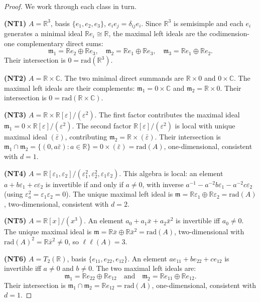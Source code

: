 \documentclass{amsart}
\theoremstyle{plain}
\theoremstyle{definition}
\theoremstyle{remark}
\newcommand{\RR}{\mathbb{R}}
\newcommand{\CC}{\mathbb{C}}
\newcommand{\Jac}{\mathrm{rad}}
\newcommand{\LL}{\ell\ell}
\begin{document}
\begin{proof}
We work through each class in turn.

\smallskip\noindent
\textbf{(NT1)} $A = \RR^3$, basis $\{e_1, e_2, e_3\}$, $e_ie_j = \delta_{ij}e_i$.
Since $\RR^3$ is semisimple and each $e_i$ generates a minimal ideal
$\RR e_i \cong \RR$, the maximal left ideals are the codimension-one
complementary direct sums:
\[
  \mathfrak{m}_1 = \RR e_2 \oplus \RR e_3,\quad
  \mathfrak{m}_2 = \RR e_1 \oplus \RR e_3,\quad
  \mathfrak{m}_3 = \RR e_1 \oplus \RR e_2.
\]
Their intersection is $0 = \Jac(\RR^3)$.

\smallskip\noindent
\textbf{(NT2)} $A = \RR \times \CC$.
The two minimal direct summands are $\RR \times 0$ and $0 \times \CC$.
The maximal left ideals are their complements:
$\mathfrak{m}_1 = 0 \times \CC$ and $\mathfrak{m}_2 = \RR \times 0$.
Their intersection is $0 = \Jac(\RR \times \CC)$.

\smallskip\noindent
\textbf{(NT3)} $A = \RR \times \RR[\varepsilon]/(\varepsilon^2)$.
The first factor contributes the maximal ideal
$\mathfrak{m}_1 = 0 \times \RR[\varepsilon]/(\varepsilon^2)$.
The second factor $\RR[\varepsilon]/(\varepsilon^2)$ is local with
unique maximal ideal $(\bar\varepsilon)$, contributing
$\mathfrak{m}_2 = \RR \times (\bar\varepsilon)$.
Their intersection is
$\mathfrak{m}_1 \cap \mathfrak{m}_2
 = \{(0, a\bar\varepsilon) : a \in \RR\}
 = 0 \times (\bar\varepsilon) = \Jac(A)$,
one-dimensional, consistent with $d = 1$.

\smallskip\noindent
\textbf{(NT4)} $A = \RR[\varepsilon_1, \varepsilon_2]/(\varepsilon_1^2, \varepsilon_2^2, \varepsilon_1 \varepsilon_2)$.
This algebra is local: an element $a + b\varepsilon_1 + c\varepsilon_2$ is invertible
if and only if $a \neq 0$, with inverse
$a^{-1} - a^{-2}b\varepsilon_1 - a^{-2}c\varepsilon_2$ (using $\varepsilon_a^2 = \varepsilon_1 \varepsilon_2 = 0$).
The unique maximal left ideal is
$\mathfrak{m} = \RR \varepsilon_1 \oplus \RR \varepsilon_2 = \Jac(A)$,
two-dimensional, consistent with $d = 2$.

\smallskip\noindent
\textbf{(NT5)} $A = \RR[x]/(x^3)$.
An element $a_0 + a_1\bar x + a_2\bar x^2$ is invertible iff $a_0 \neq 0$.
The unique maximal ideal is
$\mathfrak{m} = \RR\bar x \oplus \RR\bar x^2 = \Jac(A)$,
two-dimensional with $\Jac(A)^2 = \RR\bar x^2 \neq 0$, so $\LL(A) = 3$.

\smallskip\noindent
\textbf{(NT6)} $A = T_2(\RR)$, basis $\{e_{11}, e_{22}, e_{12}\}$.
An element $ae_{11} + be_{22} + ce_{12}$ is invertible iff $a \neq 0$
and $b \neq 0$.
The two maximal left ideals are:
\[
  \mathfrak{m}_1 = \RR e_{22} \oplus \RR e_{12}
  \quad\text{and}\quad
  \mathfrak{m}_2 = \RR e_{11} \oplus \RR e_{12}.
\]
Their intersection is
$\mathfrak{m}_1 \cap \mathfrak{m}_2 = \RR e_{12} = \Jac(A)$,
one-dimensional, consistent with $d = 1$.
\end{proof}
\end{document}
